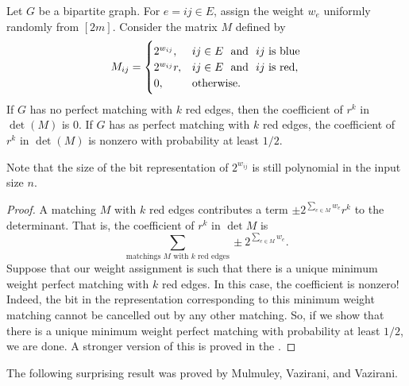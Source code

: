 \begin{ftheo}
	\label{randomized red-blue matching}
	Let $G$ be a bipartite graph. For $e = ij \in E$, assign the weight $w_e$ uniformly randomly from $[2m]$. Consider the matrix $M$ defined by
	\[ M_{ij} = \begin{cases} 2^{w_{ij}}, & \text{$ij \in E$ \text{ and } $ij$ is blue} \\ 2^{w_{ij}} r, & \text{$ij \in E$ \text{ and } $ij$ is red}, \\ 0, & \text{otherwise.} \end{cases} \]
	If $G$ has no perfect matching with $k$ red edges, then the coefficient of $r^k$ in $\det(M)$ is $0$. If $G$ has as perfect matching with $k$ red edges, the coefficient of $r^k$ in $\det(M)$ is nonzero with probability at least $1/2$.
\end{ftheo}
Note that the size of the bit representation of $2^{w_{ij}}$ is still polynomial in the input size $n$.
\begin{proof}
	A matching $M$ with $k$ red edges contributes a term $\pm 2^{\sum_{e \in M} w_e} r^k$ to the determinant. That is, the coefficient of $r^k$ in $\det M$ is
	\[ \sum_{\text{matchings $M$ with $k$ red edges}} \pm 2^{\sum_{e \in M} w_e}. \]
	Suppose that our weight assignment is such that there is a unique minimum weight perfect matching with $k$ red edges. In this case, the coefficient is nonzero! Indeed, the bit in the representation corresponding to this minimum weight matching cannot be cancelled out by any other matching. So, if we show that there is a unique minimum weight perfect matching with probability at least $1/2$, we are done. A stronger version of this is proved in the .
\end{proof}

The following surprising result was proved by Mulmuley, Vazirani, and Vazirani.

